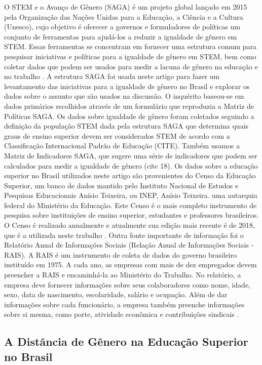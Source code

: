 O STEM e o Avanço de Gênero (SAGA) é um projeto global lançado em 2015 pela Organização das Nações Unidas para a Educação, a Ciência e a Cultura (Unesco), cujo objetivo é oferecer a governos e formuladores de políticas um conjunto de ferramentas para ajudá-los a reduzir a igualdade de gênero em STEM. Essas ferramentas se concentram em fornecer uma estrutura comum para pesquisar iniciativas e políticas para a igualdade de gênero em STEM, bem como coletar dados que podem ser usados para medir a lacuna de gênero na educação e no trabalho \citep{noauthor_saga_nodate}. A estrutura SAGA foi usada neste artigo para fazer um levantamento das iniciativas para a igualdade de gênero no Brasil e explorar os dados sobre o assunto que são usados na discussão. O inquérito baseou-se em dados primários recolhidos através de um formulário que reproduzia a Matriz de Políticas SAGA. Os dados sobre igualdade de gênero foram coletados seguindo a definição da população STEM dada pela estrutura SAGA que determina quais graus de ensino superior devem ser considerados STEM de acordo com a Classificação Internacional Padrão de Educação (CITE). Também usamos a Matriz de Indicadores SAGA, que sugere uma série de indicadores que podem ser calculados para medir a igualdade de gênero (cite 18). Os dados sobre a educação superior no Brasil utilizados neste artigo são provenientes do Censo da Educação Superior, um banco de dados mantido pelo Instituto Nacional de Estudos e Pesquisas Educacionais Anísio Teixeira, ou INEP, Anísio Teixeira. uma autarquia federal do Ministério da Educação. Este Censo é o mais completo instrumento de pesquisa sobre instituições de ensino superior, estudantes e professores brasileiros. O Censo é realizado anualmente e atualmente sua edição mais recente é de 2018, que é a utilizada neste trabalho \citep{noauthor_censo_nodate}. Outra fonte importante de informação foi o Relatório Anual de Informações Sociais (Relação Anual de Informações Sociais - RAIS). A RAIS é um instrumento de coleta de dados do governo brasileiro instituído em 1975. A cada ano, as empresas com mais de dez empregados devem preencher a RAIS e encaminhá-la ao Ministério do Trabalho. No relatório, a empresa deve fornecer informações sobre seus colaboradores como nome, idade, sexo, data de nascimento, escolaridade, salário e ocupação. Além de dar informações sobre cada funcionário, a empresa também preenche informações sobre si mesma, como porte, atividade econômica e contribuições sindicais \citep{noauthor_rais_nodate}.

\subsection{A Distância de Gênero na Educação Superior no Brasil}


